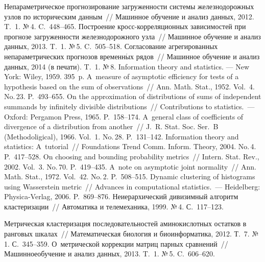 \begin{multicols}{2}
{\small\frenchspacing
{%
\begin{thebibliography}{99}
Непараметрическое прогнозирование загруженности системы железнодорожных
узлов по историческим данным~// Машинное обучение и анализ данных,  2012.
T.~1. №\,4. C.~448--465.
    Построение кросс-корреляционных зависимостей при прогнозе загруженности
    железнодорожного узла~// Машинное обучение и анализ данных,  2013.
    T.~1. №\,5.  C.~505--518.
      Согласование агрегированных
    непараметрических прогнозов временн$\acute{\mbox{ы}}$х рядов~// Машинное обучение и анализ
    данных, 2014  (в печати). T.~1. №\,8.
 Information theory and statistics. --- New York: Wiley, 1959. 395~p.
   A~measure of asymptotic efficiency for tests of a hypothesis
based on the sum of observations~// Ann.  Math. Stat., 1952.
Vol.~4. No.\,23. P.~493--655.
 On the approximation of distributions of sums of
independent summands by infinitely divisible distributions~//
{Contributions to statistics}.~--- Oxford: Pergamon Press, 1965. P.~158--174.
     A~general class of coefficients of
    divergence of a distribution from another~// J.~R. Stat. Soc.
    Ser.~B (Methodoligical),  1966. Vol.~1. No.\,28. P.~131--142.
 Information theory and statistics: A~tutorial~//
Foundations Trend Comm. Inform. Theory, 2004. No.\,4. P.~417--528.
 On choosing and bounding probability
metrics~// Intern. Stat. Rev., 2002. Vol.~3. No.\,70. P.~419--435.
  A~note on asymptotic joint normality~//
Ann. Math. Stat., 1972. Vol.~42. No.\,2. P.~508--515.
    Dynamic clustering of histograms using Wasserstein metric~//
    Advances in computational statistics.~--- Heidelberg: Physica-Verlag, 2006. P.~869--876.
 Неиерархический дивизимный алгоритм кластеризации~//
Автоматика и телемеханика, 1999. №\,4. С.~117--123.

 Метрическая
кластеризация последовательностей аминокислотных остатков в ранговых шкалах~//
Математическая биология и биоинформатика, 2012. Т.~7. №\,1. С.~345--359.
 О~метрической коррекции мат\-риц
парных сравнений~// Машинное\linebreak обучение и анализ данных, 2013.  T.~1. №\,5.  C.~606--620.


\end{thebibliography}}}
\end{multicols}
